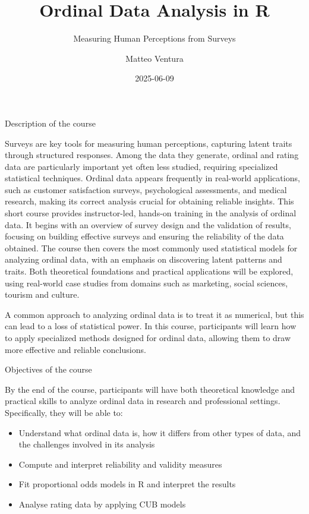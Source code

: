 \documentclass[
  letterpaper,
  DIV=11,
  numbers=noendperiod]{scrartcl}
\title{Ordinal Data Analysis in R}
\subtitle{Measuring Human Perceptions from Surveys}
\author{Matteo Ventura}
\date{2025-06-09}
\providecommand{\tightlist}{%
  \setlength{\itemsep}{0pt}\setlength{\parskip}{0pt}}\usepackage{longtable,booktabs,array}
\begin{document}
\maketitle
\ifdefined\Shaded\renewenvironment{Shaded}{\begin{tcolorbox}[frame hidden, borderline west={3pt}{0pt}{shadecolor}, sharp corners, breakable, interior hidden, boxrule=0pt, enhanced]}{\end{tcolorbox}}\fi

Description of the course

Surveys are key tools for measuring human perceptions, capturing latent
traits through structured responses. Among the data they generate,
ordinal and rating data are particularly important yet often less
studied, requiring specialized statistical techniques. Ordinal data
appears frequently in real-world applications, such as customer
satisfaction surveys, psychological assessments, and medical research,
making its correct analysis crucial for obtaining reliable insights.
This short course provides instructor-led, hands-on training in the
analysis of ordinal data. It begins with an overview of survey design
and the validation of results, focusing on building effective surveys
and ensuring the reliability of the data obtained. The course then
covers the most commonly used statistical models for analyzing ordinal
data, with an emphasis on discovering latent patterns and traits. Both
theoretical foundations and practical applications will be explored,
using real-world case studies from domains such as marketing, social
sciences, tourism and culture.

A common approach to analyzing ordinal data is to treat it as numerical,
but this can lead to a loss of statistical power. In this course,
participants will learn how to apply specialized methods designed for
ordinal data, allowing them to draw more effective and reliable
conclusions.

Objectives of the course

By the end of the course, participants will have both theoretical
knowledge and practical skills to analyze ordinal data in research and
professional settings. Specifically, they will be able to:

\begin{itemize}
\tightlist
\item
  Understand what ordinal data is, how it differs from other types of
  data, and the challenges involved in its analysis
\item
  Compute and interpret reliability and validity measures
\item
  Fit proportional odds models in R and interpret the results
\item
  Analyse rating data by applying CUB models
\end{itemize}
\end{document}
